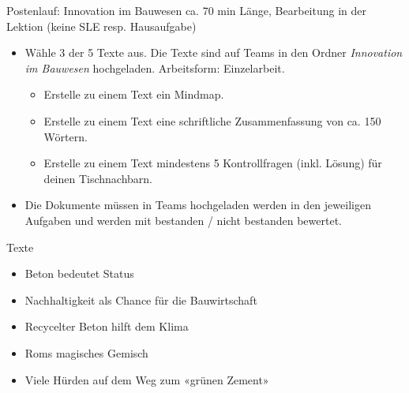 \begin{frame}{Postenlauf: Innovation im Bauwesen}
    ca. 70 min Länge, Bearbeitung in der Lektion (keine SLE resp. Hausaufgabe)
    \begin{itemize}
        \item [\textbullet] Wähle 3 der 5 Texte aus. Die Texte sind auf Teams in den Ordner \textit{Innovation im Bauwesen} hochgeladen. Arbeitsform: Einzelarbeit. 
              \begin{itemize}
                  \item [\textbullet] Erstelle zu einem Text ein Mindmap.
                  \item [\textbullet] Erstelle zu einem Text eine schriftliche Zusammenfassung von ca. 150 Wörtern.
                  \item [\textbullet] Erstelle zu einem Text mindestens 5 Kontrollfragen (inkl. Lösung) für deinen Tischnachbarn.
              \end{itemize}
        \item [\textbullet] Die Dokumente müssen in Teams hochgeladen  werden in den jeweiligen Aufgaben und werden mit bestanden / nicht bestanden bewertet.
    \end{itemize}
\end{frame}

\begin{frame}{Texte}
    \begin{itemize}
        \item[\textbullet] Beton bedeutet Status
        \item[\textbullet] Nachhaltigkeit als Chance für die Bauwirtschaft
        \item[\textbullet] Recycelter Beton hilft dem Klima
        \item[\textbullet] Roms magisches Gemisch
        \item[\textbullet] Viele Hürden auf dem Weg zum «grünen Zement»
    \end{itemize}

\end{frame}




